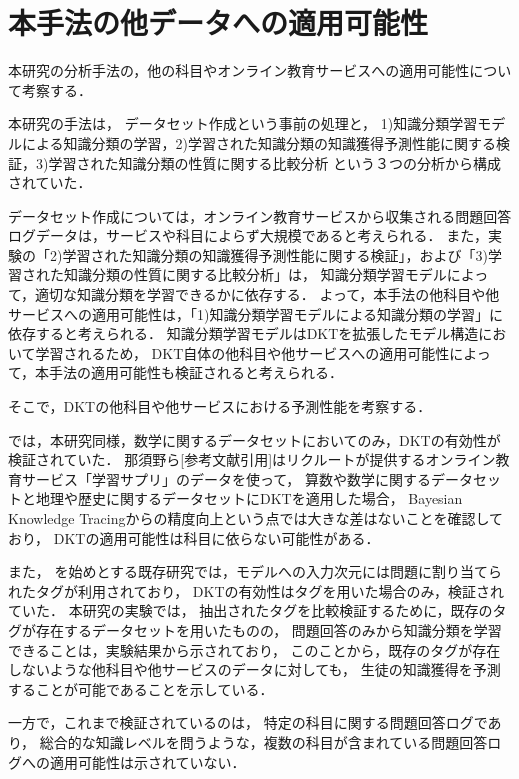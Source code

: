 \section{本手法の他データへの適用可能性}

本研究の分析手法の，他の科目やオンライン教育サービスへの適用可能性について考察する．


本研究の手法は，
データセット作成という事前の処理と，
1)知識分類学習モデルによる知識分類の学習，2)学習された知識分類の知識獲得予測性能に関する検証，3)学習された知識分類の性質に関する比較分析
という３つの分析から構成されていた．

データセット作成については，オンライン教育サービスから収集される問題回答ログデータは，サービスや科目によらず大規模であると考えられる．
また，実験の「2)学習された知識分類の知識獲得予測性能に関する検証」，および「3)学習された知識分類の性質に関する比較分析」は，
知識分類学習モデルによって，適切な知識分類を学習できるかに依存する．
よって，本手法の他科目や他サービスへの適用可能性は，「1)知識分類学習モデルによる知識分類の学習」に依存すると考えられる．
知識分類学習モデルはDKTを拡張したモデル構造において学習されるため，
DKT自体の他科目や他サービスへの適用可能性によって，本手法の適用可能性も検証されると考えられる．


そこで，DKTの他科目や他サービスにおける予測性能を考察する．

\cite{piech2015deep}では，本研究同様，数学に関するデータセットにおいてのみ，DKTの有効性が検証されていた．
那須野ら[参考文献引用]はリクルートが提供するオンライン教育サービス「学習サプリ」のデータを使って，
算数や数学に関するデータセットと地理や歴史に関するデータセットにDKTを適用した場合，
Bayesian Knowledge Tracingからの精度向上という点では大きな差はないことを確認しており，
DKTの適用可能性は科目に依らない可能性がある．

また，
\cite{piech2015deep}を始めとする既存研究では，モデルへの入力次元には問題に割り当てられたタグが利用されており，
DKTの有効性はタグを用いた場合のみ，検証されていた．
本研究の実験では，
抽出されたタグを比較検証するために，既存のタグが存在するデータセットを用いたものの，
問題回答のみから知識分類を学習できることは，実験結果から示されており，
このことから，既存のタグが存在しないような他科目や他サービスのデータに対しても，
生徒の知識獲得を予測することが可能であることを示している．


一方で，これまで検証されているのは，
特定の科目に関する問題回答ログであり，
総合的な知識レベルを問うような，複数の科目が含まれている問題回答ログへの適用可能性は示されていない．

